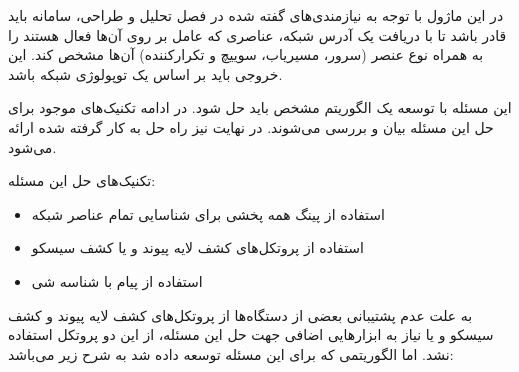 در این ماژول با توجه به نیازمندی‌های گفته شده در فصل تحلیل و طراحی، سامانه باید قادر باشد تا با دریافت یک آدرس شبکه، عناصری که عامل  بر روی آن‌ها فعال هستند را به همراه نوع عنصر (سرور، مسیریاب، سوییچ و تکرارکننده) آن‌ها مشخص کند. این خروجی باید بر اساس یک توپولوژی شبکه باشد.


این مسئله با توسعه یک الگوریتم مشخص باید حل شود. در ادامه تکنیک‌های موجود برای حل این مسئله بیان و بررسی می‌شوند. در نهایت نیز راه حل به کار گرفته شده ارائه می‌شود.

تکنیک‌های حل این مسئله:

\begin{itemize}
    \item استفاده از پینگ همه پخشی برای شناسایی تمام عناصر شبکه
    \item استفاده از پروتکل‌های کشف لایه پیوند و یا کشف سیسکو
    \item استفاده از پیام  با شناسه شی 
\end{itemize}

به علت عدم پشتیبانی بعضی از دستگاه‌ها از پروتکل‌های کشف لایه پیوند و کشف سیسکو و یا نیاز به ابزارهایی اضافی جهت حل این مسئله، از این دو پروتکل استفاده نشد. اما الگوریتمی که برای این مسئله توسعه داده شد به شرح زیر می‌باشد:

